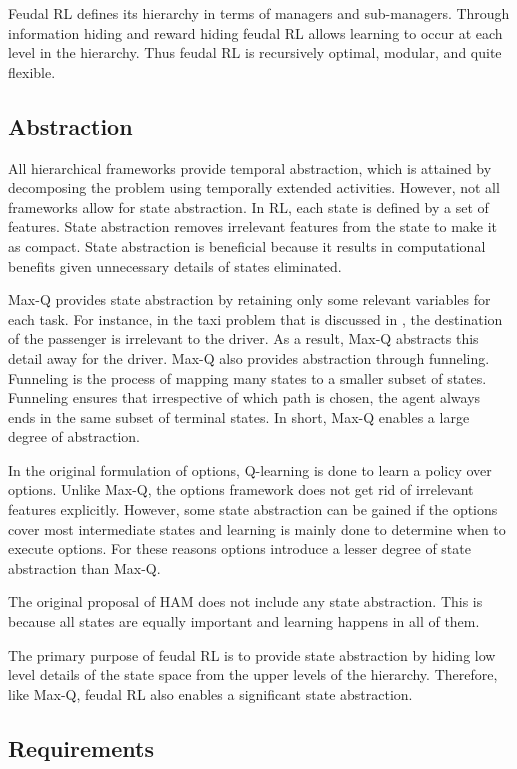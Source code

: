 Feudal RL defines its hierarchy in terms of managers and sub-managers.
Through information hiding and reward hiding feudal RL allows learning to occur at each level in the hierarchy.
Thus feudal RL is recursively optimal, modular, and quite flexible.
\subsection{Abstraction}

All hierarchical frameworks provide temporal abstraction, which is attained by decomposing the problem
using temporally extended activities. However, not all frameworks allow for state abstraction.
In RL, each state is defined by a set of features. State abstraction removes irrelevant features from
the state to make it as compact. State abstraction is beneficial because it results in computational benefits given
unnecessary details of states eliminated.

Max-Q provides state abstraction by retaining only some relevant variables for each task.
For instance, in the taxi problem that is discussed in \cite{Dietterich},
the destination of the passenger is irrelevant to the driver.
As a result, Max-Q abstracts this detail away for the driver.
Max-Q also provides abstraction through funneling.
Funneling is the process of mapping many states to a smaller subset of states.
Funneling ensures that irrespective of which path is chosen,
the agent always ends in the same subset of terminal states.
In short, Max-Q enables a large degree of abstraction.

In the original formulation of options, Q-learning is done to learn a policy over options.
Unlike Max-Q, the options framework does not get rid of irrelevant features explicitly.
However, some state abstraction can be gained if the options cover most intermediate states
and learning is mainly done to determine when to execute options.
For these reasons options introduce a lesser degree of state abstraction than Max-Q.

The original proposal of HAM does not include any state abstraction.
This is because all states are equally important and learning happens in all of them.

The primary purpose of feudal RL is to provide state abstraction by hiding low level details
of the state space from the upper levels of the hierarchy. Therefore, like Max-Q, feudal RL
also enables a significant state abstraction.

\subsection{Requirements}

